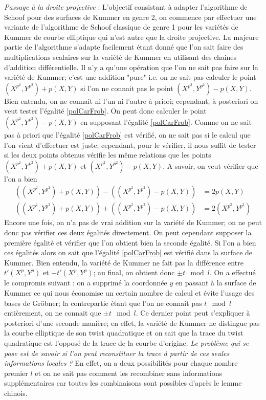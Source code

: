 \documentclass[a4paper]{article}
\theoremstyle{definition}
\theoremstyle{remark}
\numberwithin{equation}{section}
\begin{document}
\emph{Passage à la droite projective} : L'objectif consistant à adapter l'algorithme de Schoof pour des surfaces de Kummer en genre 2, on commence par effectuer une variante de l'algorithme de Schoof classique de genre 1 pour les variétés de Kummer de courbe elliptique qui n'est autre que la droite projective. La majeure partie de l'algorithme s'adapte facilement étant donné que l'on sait faire des multiplications scalaires sur la variété de Kummer en utilisant des chaines d'addition différentielle. Il n'y a qu'une opération que l'on ne sait pas faire sur la variété de Kummer; c'est une addition "pure" i.e. on ne sait pas calculer le point $(X^{p^2},Y^{p^2}) + p(X,Y)$ si l'on ne connait pas le point $(X^{p^2},Y^{p^2}) - p(X,Y)$. Bien entendu, on ne connait ni l'un ni l'autre à priori; cependant, à posteriori on veut tester l'égalité \eqref{polCarFrob}. On peut donc calculer le point $(X^{p^2},Y^{p^2}) - p(X,Y)$ en supposant l'égalité \eqref{polCarFrob}. Comme on ne sait pas à priori que l'égalité \eqref{polCarFrob} est vérifié, on ne sait pas si le calcul que l'on vient d'effectuer est juste; cependant, pour le vérifier, il nous suffit de tester si les deux points obtenus vérifie les même relations que les points $(X^{p^2},Y^{p^2}) + p(X,Y)$ et $(X^{p^2},Y^{p^2}) - p(X,Y)$. A savoir, on veut vérifier que l'on a bien
\begin{align*}
((X^{p^2},Y^{p^2}) + p(X,Y)) - ((X^{p^2},Y^{p^2}) - p(X,Y)) &= 2p(X,Y) \\
((X^{p^2},Y^{p^2}) + p(X,Y)) + ((X^{p^2},Y^{p^2}) - p(X,Y)) &= 2(X^{p^2},Y^{p^2})
\end{align*}
Encore une fois, on n'a pas de vrai addition sur la variété de Kummer; on ne peut donc pas vérifier ces deux égalités directement. On peut cependant supposer la première égalité et vérifier que l'on obtient bien la seconde égalité. Si l'on a bien ces égalités alors on sait que l'égalité \eqref{polCarFrob} est vérifié dans la surface de Kummer. Bien entendu, la variété de Kummer ne fait pas la différence entre $t'(X^p,Y^p)$ et $-t'(X^p,Y^p)$; au final, on obtient donc $\pm t \mod l$. On a effectué le compromis suivant : on a supprimé la coordonnée $y$ en passant à la surface de Kummer ce qui nous économise un certain nombre de calcul et évite l'usage des bases de Gröbner; la contrepartie étant que l'on ne connait pas $t \mod l$ entièrement, on ne connait que $\pm t \mod l$. Ce dernier point peut s'expliquer à posteriori d'une seconde manière; en effet, la variété de Kummer ne distingue pas la courbe elliptique de son twist quadratique et on sait que la trace du twist quadratique est l'opposé de la trace de la courbe d'origine. \emph{Le problème qui se pose est de savoir si l'on peut reconstituer la trace à partir de ces seules informations locales ?} En effet, on a deux possibilités pour chaque nombre premier $l$ et on ne sait pas comment les recombiner sans informations supplémentaires car toutes les combinaisons sont possibles d'après le lemme chinois.
\end{document}
